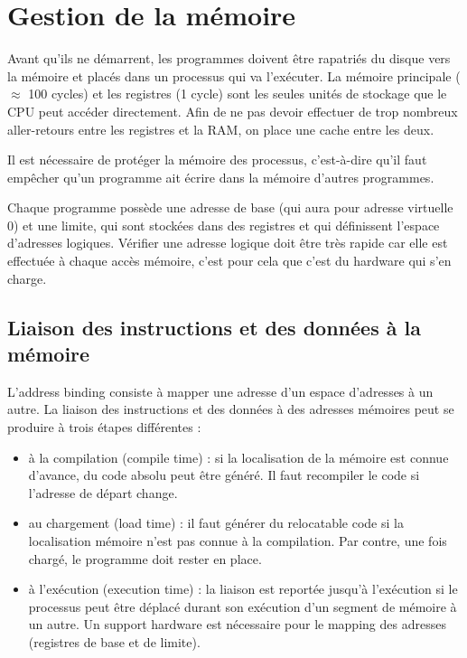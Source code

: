 \chapter{Gestion de la mémoire}

Avant qu'ils ne démarrent, les programmes doivent être rapatriés du disque vers la mémoire et placés dans un processus qui va l'exécuter. La mémoire principale ($\approx$ 100 cycles) et les registres (1 cycle) sont les seules unités de stockage que le CPU peut accéder directement. Afin de ne pas devoir effectuer de trop nombreux aller-retours entre les registres et la RAM, on place une cache entre les deux.

Il est nécessaire de protéger la mémoire des processus, c'est-à-dire qu'il faut empêcher qu'un programme ait écrire dans la mémoire d'autres programmes.

Chaque programme possède une adresse de base (qui aura pour adresse virtuelle 0) et une limite, qui sont stockées dans des registres et qui définissent l'espace d'adresses logiques. Vérifier une adresse logique doit être très rapide car elle est effectuée à chaque accès mémoire, c'est pour cela que c'est du hardware qui s'en charge.


\section{Liaison des instructions et des données à la mémoire}

L'address binding consiste à mapper une adresse d'un espace d'adresses à un autre. La liaison des instructions et des données à des adresses mémoires peut se produire à trois étapes différentes :

\begin{itemize}
	\item à la compilation (compile time) : si la localisation de la mémoire est connue d'avance, du code absolu peut être généré. Il faut recompiler le code si l'adresse de départ change.
	\item au chargement (load time) : il faut générer du relocatable code si la localisation mémoire n'est pas connue à la compilation. Par contre, une fois chargé, le programme doit rester en place.
	\item à l'exécution (execution time) : la liaison est reportée jusqu'à l'exécution si le processus peut être déplacé durant son exécution d'un segment de mémoire à un autre. Un support hardware est nécessaire pour le mapping des adresses (registres de base et de limite).
\end{itemize}

